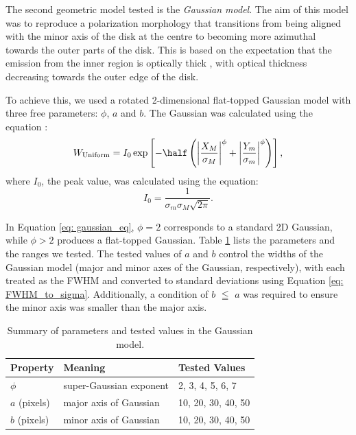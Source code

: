 

The second geometric model tested is the \emph{Gaussian model}. The aim of this model was to reproduce a polarization morphology that transitions from being aligned with the minor axis of the disk at the centre to becoming more azimuthal towards the outer parts of the disk. This is based on the expectation that the emission from the inner region is optically thick \citep{Kataoka_2015}, with optical thickness decreasing towards the outer edge of the disk. 


To achieve this, we used a rotated 2-dimensional flat-topped Gaussian model with three free parameters: $\phi$, $a$ and $b$. The Gaussian was calculated using the equation :
\begin{equation}
W_{\text{Uniform}} =  I_0 
\exp\left[-\half \left(\left|\frac{X_{M}}{\sigma_M}\right|^\phi + \left|\frac{Y_{m}}{ \sigma_m}\right|^\phi\right)\right],
    \label{eq: gaussian_eq}
\end{equation}
\noindent where $I_0$, the peak value, was calculated using the equation:
\begin{equation}
    I_0 = \frac{1} {\sigma_m \sigma_M \sqrt{2\pi}}.
    \label{eq: Gaussian_model_I0}
\end{equation}

\noindent In Equation \ref{eq: gaussian_eq}, $\phi=2$ corresponds to a standard 2D Gaussian, while $\phi>2$ produces a flat-topped Gaussian. Table \ref{tab: gaussian_model_info} lists the parameters and the ranges we tested. The tested values of $a$ and $b$ control the widths of the Gaussian model (major and minor axes of the Gaussian, respectively), with each treated as the FWHM and converted to standard deviations using Equation \ref{eq: FWHM_to_sigma}. Additionally, a condition of $b$ $\leqq $ $a$ was required to ensure the minor axis was smaller than the major axis. 




\begin{table}[h!]
\centering
\caption{Summary of parameters and tested values in the Gaussian model.  }
\begin{tabular}{lll}
\toprule
\textbf{Property} &
\textbf{Meaning} &
\textbf{Tested Values}  \\
\midrule

$\phi$
& super-Gaussian exponent
& 2, 3, 4, 5, 6, 7\\


$a$ (pixels)
& major axis of Gaussian
& 10, 20, 30, 40, 50\\

$b$ (pixels)
& minor axis of Gaussian
& 10, 20, 30, 40, 50\\

\bottomrule
\end{tabular}
\label{tab: gaussian_model_info}
\end{table}


